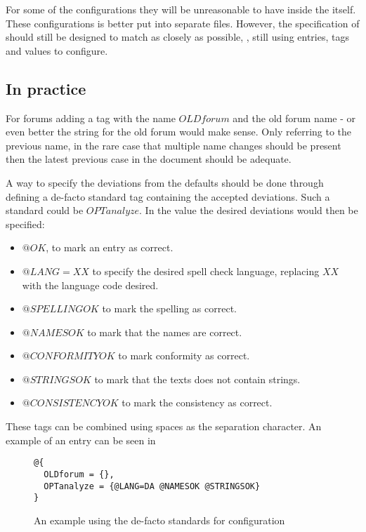 For some of the configurations they will be unreasonable to have
inside the  itself.  These configurations is better put into
separate files.  However, the specification of should still be
designed to match {\bibtex} as closely as possible, \ie, still using
entries, tags and values to configure.


\subsection{In practice}

For forums adding a tag with the name $OLDforum$ and the old forum
name - or even better the string for the old forum would make sense.
Only referring to the previous name, in the rare case that multiple
name changes should be present then the latest previous case in the
document should be adequate. 

A way to specify the deviations from the defaults should be done
through defining a de-facto standard tag containing the accepted
deviations.  Such a standard could be $OPTanalyze$.  In the value the
desired deviations would then be specified:

\begin{itemize}
\item $@OK$, to mark an entry as correct.
\item $@LANG=XX$ to specify the desired spell check language,
  replacing $XX$ with the language code desired.
\item $@SPELLINGOK$ to mark the spelling as correct.
\item $@NAMESOK$ to mark that the names are correct.
\item $@CONFORMITYOK$ to mark conformity as correct.
\item $@STRINGSOK$ to mark that the texts does not contain strings.
\item $@CONSISTENCYOK$ to mark the consistency as correct.
\end{itemize}

These tags can be combined using spaces as the separation character.
An example of an entry can be seen in

\begin{figure}
  \centering
\begin{verbatim}
@{
  OLDforum = {},
  OPTanalyze = {@LANG=DA @NAMESOK @STRINGSOK}
}
\end{verbatim}
  \caption{An example using the de-facto standards for configuration}
  \label{fig:analyzing_added_de_facto_standards}
\end{figure}

